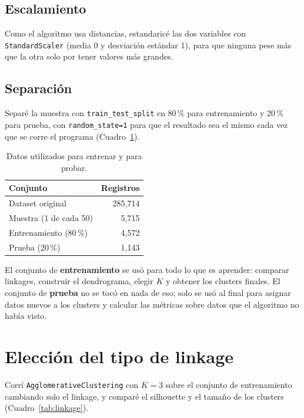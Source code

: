 \documentclass[11pt,a4paper]{article}
\begin{document}
\subsection{Escalamiento}

Como el algoritmo usa distancias, estandaricé las dos variables con \texttt{StandardScaler} (media 0 y desviación estándar 1), para que ninguna pese más que la otra solo por tener valores más grandes.

\subsection{Separación}

Separé la muestra con \texttt{train\_test\_split} en 80\,\% para entrenamiento y 20\,\% para prueba, con \texttt{random\_state=1} para que el resultado sea el mismo cada vez que se corre el programa (Cuadro~\ref{tab:split}).

\begin{table}[H]
  \centering
  \begin{tabular}{lr}
    \toprule
    Conjunto & Registros \\
    \midrule
    Dataset original & 285{,}714 \\
    Muestra (1 de cada 50) & 5{,}715 \\
    Entrenamiento (80\,\%) & 4{,}572 \\
    Prueba (20\,\%) & 1{,}143 \\
    \bottomrule
  \end{tabular}
  \caption{Datos utilizados para entrenar y para probar.}
  \label{tab:split}
\end{table}

El conjunto de \textbf{entrenamiento} se usó para todo lo que es aprender: comparar linkages, construir el dendrograma, elegir $K$ y obtener los clusters finales. El conjunto de \textbf{prueba} no se tocó en nada de eso; solo se usó al final para asignar datos nuevos a los clusters y calcular las métricas sobre datos que el algoritmo no había visto.

\section{Elección del tipo de linkage}
\label{sec:linkage}

Corrí \texttt{AgglomerativeClustering} con $K=3$ sobre el conjunto de entrenamiento cambiando solo el linkage, y comparé el silhouette y el tamaño de los clusters (Cuadro~\ref{tab:linkage}).
\end{document}
